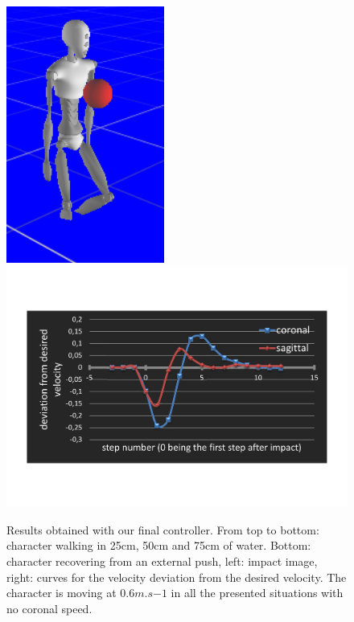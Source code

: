 \documentclass[conference]{acmsiggraph}
\begin{document}
\begin{figure}[t]
\includegraphics[scale=0.28]{images/strips/ball/img_impact.png}
\includegraphics[scale=0.255]{images/strips/ball/speed_evo_after_impact.pdf}
\caption{Results obtained with our final controller. From top to bottom: character walking in 25cm, 50cm and 75cm of water. Bottom: character recovering from an external push, left: impact image, right: curves for the velocity deviation from the desired velocity. The character is moving at $0.6m.s{-1}$ in all the presented situations with no coronal speed.}
\label{fig:controller_results}
\end{figure}
\end{document}
